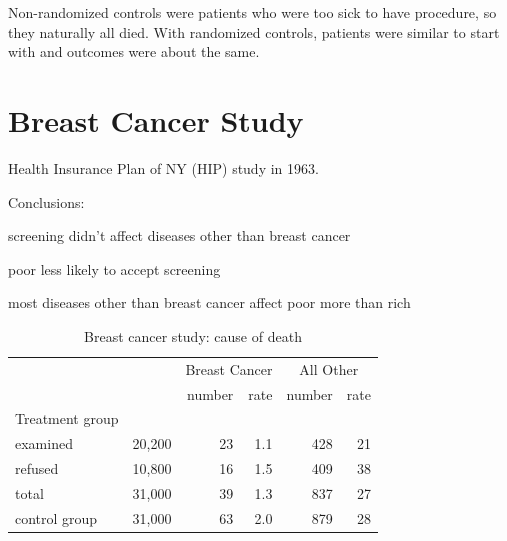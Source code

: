 \documentclass[landscape]{exam}
\begin{document}
  Non-randomized controls were patients who were too sick to have procedure, so
  they naturally all died.  With randomized controls, patients were similar to
  start with and outcomes were about the same.

  \section{Breast Cancer Study}
  Health Insurance Plan of NY (HIP) study in 1963.

  Conclusions:
  \begin{itemize*}
    \item screening didn't affect diseases other than breast cancer
    \item poor less likely to accept screening
    \item most diseases other than breast cancer affect poor more than rich
  \end{itemize*}

  \begin{table}
    \centering
    \begin{tabular}{lrrrrr}
      & & \multicolumn{2}{c}{Breast Cancer} & \multicolumn{2}{c}{All Other} \\
                               \cmidrule(r){3-4} \cmidrule(r){5-6}    
                      &        & number & rate & number & rate \\
      Treatment group \\
      examined        & 20,200 & 23     & 1.1  & 428    & 21 \\
      refused         & 10,800 & 16     & 1.5  & 409    & 38 \\
      total           & 31,000 & 39     & 1.3  & 837    & 27 \\
    \midrule
      control group   & 31,000 & 63     & 2.0  & 879    & 28 \\
    \end{tabular}
    \caption{Breast cancer study: cause of death}\label{tab:breast.cancer}
  \end{table}
\end{document}
